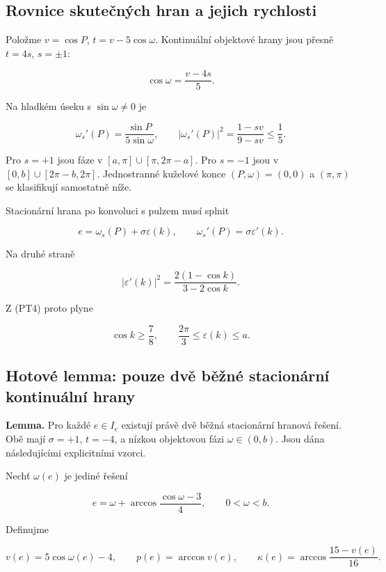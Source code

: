 \documentclass[11pt,a4paper]{article}
\theoremstyle{remark}\newtheorem{remark}[theorem]{Poznámka}
\numberwithin{equation}{section}
\begin{document}
\subsection{Rovnice skutečných hran a jejich rychlosti}\label{rovnice-skuteux10dnuxfdch-hran-a-jejich-rychlosti}

Položme \(v=\cos P\), \(t=v-5\cos\omega\).
Kontinuální objektové hrany jsou přesně \(t=4s\), \(s=\pm1\):

\[
\cos\omega=\frac{v-4s}{5}.
\tag{PT3}
\]

Na hladkém úseku s \(\sin\omega\ne0\) je

\[
\omega_s'(P)=\frac{\sin P}{5\sin\omega},\qquad
|\omega_s'(P)|^2=
\frac{1-sv}{9-sv}\le\frac15.
\tag{PT4}
\]

Pro \(s=+1\) jsou fáze v
\([a,\pi]\cup[\pi,2\pi-a]\).
Pro \(s=-1\) jsou v
\([0,b]\cup[2\pi-b,2\pi]\).
Jednostranné kuželové konce \((P,\omega)=(0,0)\) a
\((\pi,\pi)\) se klasifikují samostatně níže.

Stacionární hrana po konvoluci s pulzem musí splnit

\[
e=\omega_s(P)+\sigma\varepsilon(k),\qquad
\omega_s'(P)=\sigma\varepsilon'(k).
\tag{PT5}
\]

Na druhé straně

\[
|\varepsilon'(k)|^2=
\frac{2(1-\cos k)}{3-2\cos k}.
\]

Z (PT4) proto plyne

\[
\cos k\ge\frac78,\qquad
\frac{2\pi}{3}\le\varepsilon(k)\le a.
\tag{PT6}
\]

\subsection{Hotové lemma: pouze dvě běžné stacionární kontinuální hrany}\label{hotovuxe9-lemma-pouze-dvux11b-bux11bux17enuxe9-stacionuxe1rnuxed-kontinuuxe1lnuxed-hrany}

\textbf{Lemma.} Pro každé \(e\in I_e\) existují právě dvě běžná
stacionární hranová řešení. Obě mají \(\sigma=+1\), \(t=-4\),
a nízkou objektovou fázi
\(\omega\in(0,b)\). Jsou dána následujícími explicitními vzorci.

Nechť \(\omega(e)\) je jediné řešení

\[
e=\omega+
\arccos\frac{\cos\omega-3}{4},\qquad 0<\omega<b.
\tag{PT7}
\]

Definujme

\[
v(e)=5\cos\omega(e)-4,\qquad
p(e)=\arccos v(e),\qquad
\kappa(e)=\arccos\frac{15-v(e)}{16}.
\tag{PT8}
\]
\end{document}
